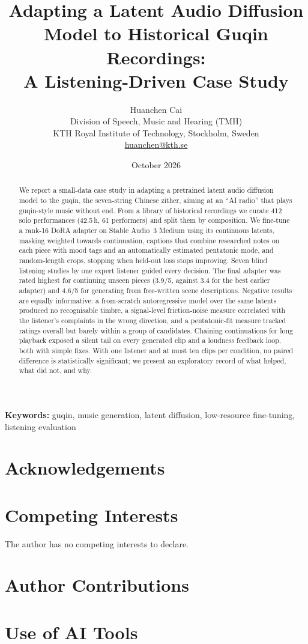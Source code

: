 \documentclass[11pt]{article}
\title{Adapting a Latent Audio Diffusion Model to Historical Guqin Recordings:\\
A Listening-Driven Case Study}
\author{Huanchen Cai\\
\small Division of Speech, Music and Hearing (TMH)\\
\small KTH Royal Institute of Technology, Stockholm, Sweden\\
\small \href{mailto:huanchen@kth.se}{huanchen@kth.se}}
\date{October 2026}
\begin{document}
\maketitle

\begin{abstract}
We report a small-data case study in adapting a pretrained latent audio diffusion model to the guqin, the
seven-string Chinese zither, aiming at an ``AI radio'' that plays guqin-style music without end. From a library
of historical recordings we curate 412 solo performances (42.5\,h, 61 performers) and split them by composition.
We fine-tune a rank-16 DoRA adapter on Stable Audio~3 Medium using its continuous latents, masking weighted
towards continuation, captions that combine researched notes on each piece with mood tags and an automatically
estimated pentatonic mode, and random-length crops, stopping when held-out loss stops improving. Seven blind
listening studies by one expert listener guided every decision. The final adapter was rated highest for
continuing unseen pieces (3.9/5, against 3.4 for the best earlier adapter) and 4.6/5 for generating from
free-written scene descriptions. Negative results are equally informative: a from-scratch autoregressive model
over the same latents produced no recognisable timbre, a signal-level friction-noise measure correlated with the
listener's complaints in the wrong direction, and a pentatonic-fit measure tracked ratings overall but barely
within a group of candidates. Chaining continuations for long playback exposed a silent tail on every generated
clip and a loudness feedback loop, both with simple fixes. With one listener and at most ten clips per condition,
no paired difference is statistically significant; we present an exploratory record of what helped, what did
not, and why.
\end{abstract}

\noindent\textbf{Keywords:} guqin, music generation, latent diffusion, low-resource fine-tuning, listening
evaluation



\section*{Acknowledgements}
\ackText

\section*{Competing Interests}
The author has no competing interests to declare.

\section*{Author Contributions}
\contribText

\section*{Use of AI Tools}
\aiText



\end{document}
